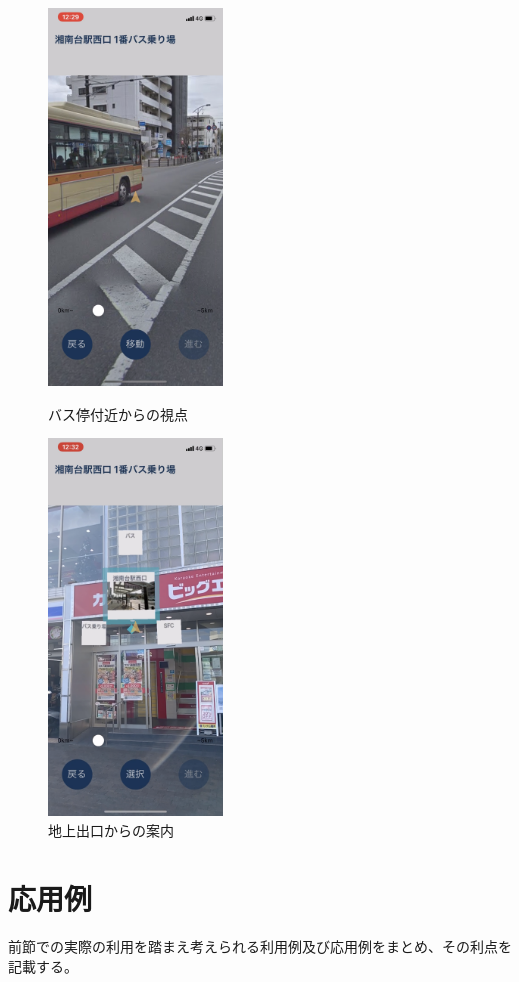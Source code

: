 \begin{figure}[h]
  \begin{minipage}{0.5\hsize}
    \centering
    \includegraphics[height=100mm]{images/shonandai_bus_moved.png}
    \caption{バス停付近からの視点} \label{fig:shonandai_bus_moved}
  \end{minipage}
  \begin{minipage}{0.5\hsize}
    \centering
    \includegraphics[height=100mm]{images/shonandai_bus2.png}
    \caption{地上出口からの案内} \label{fig:shonandai_bus2}
  \end{minipage}
\end{figure}


\section{応用例}
前節での実際の利用を踏まえ考えられる利用例及び応用例をまとめ、その利点を記載する。

